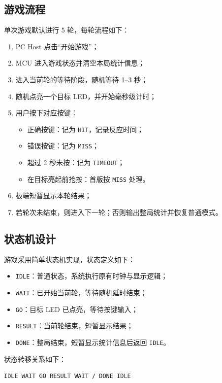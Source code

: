 \documentclass[main.tex]{subfiles}
\begin{document}
\subsection{游戏流程}

单次游戏默认进行 5 轮，每轮流程如下：

\begin{enumerate}[leftmargin=2em]
  \item PC Host 点击“开始游戏”；
  \item MCU 进入游戏状态并清空本局统计信息；
  \item 进入当前轮的等待阶段，随机等待 1--3 秒；
  \item 随机点亮一个目标 LED，并开始毫秒级计时；
  \item 用户按下对应按键：
  \begin{itemize}[leftmargin=2em]
    \item 正确按键：记为 \texttt{HIT}，记录反应时间；
    \item 错误按键：记为 \texttt{MISS}；
    \item 超过 2 秒未按：记为 \texttt{TIMEOUT}；
    \item 在目标亮起前抢按：首版按 \texttt{MISS} 处理。
  \end{itemize}
  \item 板端短暂显示本轮结果；
  \item 若轮次未结束，则进入下一轮；否则输出整局统计并恢复普通模式。
\end{enumerate}

\subsection{状态机设计}

游戏采用简单状态机实现，状态定义如下：

\begin{itemize}[leftmargin=2em]
  \item \texttt{IDLE}：普通状态，系统执行原有时钟与显示逻辑；
  \item \texttt{WAIT}：已开始当前轮，等待随机延时结束；
  \item \texttt{GO}：目标 LED 已点亮，等待按键输入；
  \item \texttt{RESULT}：当前轮结束，短暂显示结果；
  \item \texttt{DONE}：整局结束，短暂显示统计信息后返回 \texttt{IDLE}。
\end{itemize}

状态转移关系如下：

\begin{center}
\texttt{IDLE \rightarrow WAIT \rightarrow GO \rightarrow RESULT \rightarrow WAIT / DONE \rightarrow IDLE}
\end{center}
\end{document}
